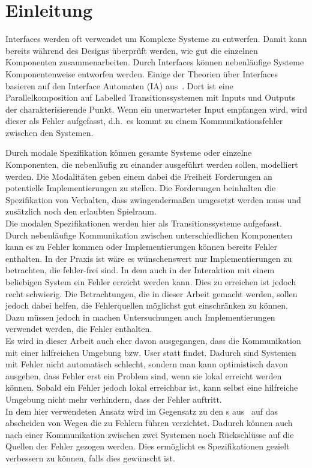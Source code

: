 \chapter{Einleitung}

Interfaces werden oft verwendet um Komplexe Systeme zu entwerfen. Damit kann
bereits während des Designs überprüft werden, wie gut die einzelnen Komponenten
zusammenarbeiten. Durch Interfaces können nebenläufige Systeme Komponentenweise
entworfen werden. Einige der Theorien über Interfaces basieren auf den
Interface Automaten (IA) aus~\cite{Alfaro2004}. Dort ist eine
Parallelkomposition auf Labelled Transitionssystemen mit Inputs und Outputs der
charakterisierende Punkt. Wenn ein unerwarteter Input empfangen wird, wird
dieser als Fehler aufgefasst, d.h.\ es kommt zu einem Kommunikationsfehler
zwischen den Systemen.

Durch modale Spezifikation können gesamte Systeme oder einzelne Komponenten,
die nebenläufig zu einander ausgeführt werden sollen, modelliert werden. Die
Modalitäten geben einem dabei die Freiheit Forderungen an potentielle
Implementierungen zu stellen. Die Forderungen beinhalten die Spezifikation von
Verhalten, dass zwingendermaßen umgesetzt werden muss und zusätzlich noch den
erlaubten Spielraum.\\
Die modalen Spezifikationen werden hier als Transitionssysteme aufgefasst.\\
Durch nebenläufige Kommunikation zwischen unterschiedlichen Komponenten kann es
zu Fehler kommen oder Implementierungen können bereits Fehler enthalten. In der
Praxis ist wäre es wünschenswert nur Implementierungen zu betrachten, die
fehler-frei sind. In dem auch in der Interaktion mit einem beliebigen System
ein Fehler erreicht werden kann. Dies zu erreichen ist jedoch recht schwierig.
Die Betrachtungen, die in dieser Arbeit gemacht werden, sollen jedoch dabei
helfen, die Fehlerquellen möglichst gut einschränken zu können. Dazu müssen
jedoch in machen Untersuchungen auch Implementierungen verwendet werden, die
Fehler enthalten.\\
Es wird in dieser Arbeit auch eher davon ausgegangen, dass die Kommunikation
mit einer hilfreichen Umgebung bzw. User statt findet. Dadurch sind Systemen
mit Fehler nicht automatisch schlecht, sondern man kann optimistisch davon
ausgehen, dass Fehler erst ein Problem sind, wenn sie lokal erreicht werden
können. Sobald ein Fehler jedoch lokal erreichbar ist, kann selbst eine
hilfreiche Umgebung nicht mehr verhindern, dass der Fehler auftritt.\\
In dem hier verwendeten Ansatz wird im Gegensatz zu den \MIA{}s
aus~\cite{Vogler2016MIA3} auf das abscheiden von Wegen die zu Fehlern führen
verzichtet. Dadurch können auch nach einer Kommunikation zwischen zwei Systemen
noch Rückschlüsse auf die Quellen der Fehler gezogen werden. Dies ermöglicht es
Spezifikationen gezielt verbessern zu können, falls dies gewünscht ist.

